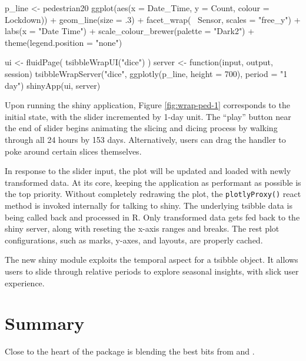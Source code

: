 \begin{Schunk}
\begin{Sinput}
p_line <- pedestrian20 %
  ggplot(aes(x = Date_Time, y = Count, colour = Lockdown)) +
  geom_line(size = .3) +
  facet_wrap(~ Sensor, scales = "free_y") +
  labs(x = "Date Time") +
  scale_colour_brewer(palette = "Dark2") +
  theme(legend.position = "none")

ui <- fluidPage(
  tsibbleWrapUI("dice")
)
server <- function(input, output, session) {
  tsibbleWrapServer("dice", ggplotly(p_line, height = 700), period = "1 day")
}
shinyApp(ui, server)
\end{Sinput}
\end{Schunk}

Upon running the shiny application, Figure \ref{fig:wrap-ped-1}
corresponds to the initial state, with the slider incremented by 1-day
unit. The ``play'' button near the end of slider begins animating the
slicing and dicing process by walking through all 24 hours by 153 days.
Alternatively, users can drag the handler to poke around certain slices
themselves.

In response to the slider input, the plot will be updated and loaded
with newly transformed data. At its core, keeping the application as
performant as possible is the top priority. Without completely redrawing
the plot, the \texttt{plotlyProxy()} react method is invoked internally
for talking to shiny. The underlying tsibble data is being called back
and processed in R. Only transformed data gets fed back to the shiny
server, along with reseting the x-axis ranges and breaks. The rest plot
configurations, such as marks, y-axes, and layouts, are properly cached.

The new shiny module exploits the temporal aspect for a tsibble object.
It allows users to slide through relative periods to explore seasonal
insights, with slick user experience.

\hypertarget{summary}{%
\section{Summary}\label{summary}}

Close to the heart of the  package is blending the
best bits from  and .



\address{%
Earo Wang\\
The University of Auckland\\%
Department of Statistics\\
%
%
%
\\\href{mailto:earo.wang@auckland.ac.nz}{\nolinkurl{earo.wang@auckland.ac.nz}}
}

\address{%
Dianne Cook\\
Monash University\\%
Department of Econometrics and Business Statistics\\
%
%
%
\\\href{mailto:dicook@monash.edu}{\nolinkurl{dicook@monash.edu}}
}

